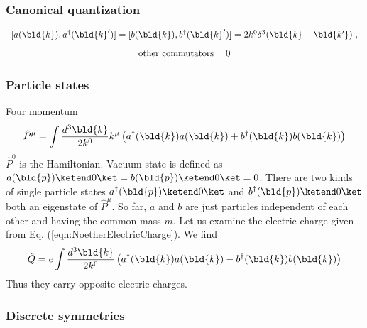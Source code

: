 \subsubsection{Canonical quantization}
\begin{equation}
\begin{array}{c}
[ a(\bld{k}), a^\dagger(\bld{k}')] = 
[ b(\bld{k}), b^\dagger(\bld{k}')] = 
2k^0\delta^3 (\bld{k} - \bld{k'} )\;,
\vspace{3mm}
\\
\mbox{other commutators} = 0
\label{eqn:complscalarcancomm}
\end{array}
\end{equation}
\subsubsection{Particle states}
Four momentum
\begin{equation}
\hat{P}^\mu = \int \frac{d^3 \bld{k}}{2k^0} k^\mu \left(
a^\dagger(\bld{k}) a(\bld{k}) + b^\dagger(\bld{k}) b(\bld{k})
\right)
\label{eqn:KGcomplex_FourMomentum}
\end{equation}
$\hat{P}^0$ is the Hamiltonian.
Vacuum state is defined as $a(\bld{p}) \ketend 0 \ket = b(\bld{p}) \ketend 0 \ket =0$.
There are two kinds of single particle states $a^\dagger(\bld{p}) \ketend 0 \ket$ and
$b^\dagger(\bld{p}) \ketend 0 \ket$ both an eigenstate of $\hat{P}^\mu$.
So far, $a$ and $b$ are just particles independent of each other and having
the common mass $m$. Let us examine the electric charge given from
Eq. (\ref{eqn:NoetherElectricCharge}). We find
\begin{equation}
\hat{Q} = e \int \frac{d^3 \bld{k}}{2k^0}  \left(
a^\dagger(\bld{k}) a(\bld{k}) - b^\dagger(\bld{k}) b(\bld{k})
\right)
\label{eqn:KGcomplex_Charge}
\end{equation}
Thus they carry opposite electric charges.
\subsubsection{Discrete symmetries}

